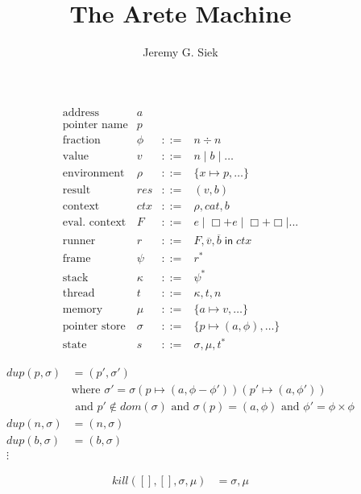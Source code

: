 \documentclass{article}
\title{The Arete Machine}
\author{Jeremy G. Siek}
\newcommand{\IN}{\mathop{\mathsf{in}}}
\begin{document}
\maketitle

\[
\begin{array}{lrcl}
  \text{address} & a \\
  \text{pointer name} & p \\
  \text{fraction} & \phi & ::= & n \div n \\
  \text{value}& v & ::= & n \mid b \mid \ldots \\
  \text{environment} & \rho & ::= & \{ x \mapsto p, \ldots \} \\
  \text{result} & \mathit{res} & ::= & (v , b) \\
  \text{context} & \mathit{ctx} & ::= & \rho, \mathit{cat}, b \\
  \text{eval. context} & F & ::= & e \mid \Box + e \mid \Box + \Box \mid ... \\
  \text{runner}& r & ::= & F, \overline{v}, \overline{b} \IN \mathit{ctx}\\
  \text{frame}& \psi & ::= & r^{*} \\
  \text{stack}& \kappa & ::= & \psi^{*} \\
  \text{thread}& t & ::= & \kappa, t, n \\
  \text{memory}& \mu & ::= & \{ a \mapsto v, \ldots \} \\
  \text{pointer store} & \sigma & ::= & \{ p \mapsto (a, \phi), \ldots \} \\
  \text{state}& s & ::= & \sigma, \mu, t^{*}
\end{array}
\]

\begin{align*}
  \mathit{dup}(p,\sigma) &= (p', \sigma') \\
  & \text{where } \sigma' = \sigma(p \mapsto (a,\phi - \phi'))(p'\mapsto (a,\phi')) \\
    & \text{ and } p' \notin \mathit{dom}(\sigma) \text{ and }
         \sigma(p) = (a,\phi) \text{ and } \phi' = \phi \times \phi \\
  \mathit{dup}(n,\sigma) &= (n,\sigma) \\
  \mathit{dup}(b,\sigma) &= (b,\sigma) \\
   \vdots
\end{align*}

\begin{align*}
\mathit{kill}([],[], \sigma,\mu) &= \sigma,\mu\\
\end{align*}
\end{document}
